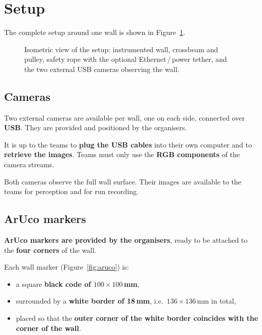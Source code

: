 \documentclass[11pt,a4paper]{article}
\begin{document}
\section{Setup}
\label{sec:setup}

The complete setup around one wall is shown in Figure~\ref{fig:setup}.

\begin{figure}[h!]
  \centering
  
  \caption{Isometric view of the setup: instrumented wall, crossbeam and
           pulley, safety rope with the optional Ethernet\,/\,power tether, and
           the two external USB cameras observing the wall.}
  \label{fig:setup}
\end{figure}

\subsection{Cameras}

Two external cameras are available per wall, one on each side, connected
over \textbf{USB}. They are provided and positioned by the organisers.

It is up to the teams to \textbf{plug the USB cables} into their own computer
and to \textbf{retrieve the images}. Teams must only use the \textbf{RGB
components} of the camera streams.

Both cameras observe the full wall surface. Their images are available to
the teams for perception and for run recording.

\subsection{ArUco markers}
\label{sec:aruco}

\textbf{ArUco markers are provided by the organisers}, ready to be attached
to the \textbf{four corners} of the wall.

Each wall marker (Figure~\ref{fig:aruco}) is:
\begin{itemize}
  \item a square \textbf{black code of $100\times100$\,mm},
  \item surrounded by a \textbf{white border of 18\,mm}, i.e.\
        $136\times136$\,mm in total,
  \item placed so that the \textbf{outer corner of the white border coincides
        with the corner of the wall}.
\end{itemize}
\end{document}
